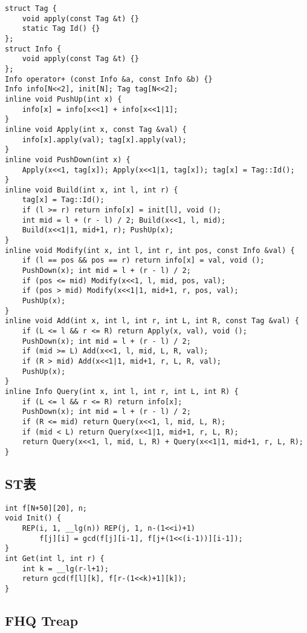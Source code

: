 \documentclass[a4paper,landscape,twocolumn]{ctexart}
\begin{document}
\begin{lstlisting}
struct Tag {
	void apply(const Tag &t) {}
	static Tag Id() {}
};
struct Info {
	void apply(const Tag &t) {}
};
Info operator+ (const Info &a, const Info &b) {}
Info info[N<<2], init[N]; Tag tag[N<<2];
inline void PushUp(int x) {
	info[x] = info[x<<1] + info[x<<1|1];
}
inline void Apply(int x, const Tag &val) {
	info[x].apply(val); tag[x].apply(val);
}
inline void PushDown(int x) {
	Apply(x<<1, tag[x]); Apply(x<<1|1, tag[x]); tag[x] = Tag::Id();
}
inline void Build(int x, int l, int r) {
	tag[x] = Tag::Id();
	if (l >= r) return info[x] = init[l], void ();
	int mid = l + (r - l) / 2; Build(x<<1, l, mid);
	Build(x<<1|1, mid+1, r); PushUp(x);
}
inline void Modify(int x, int l, int r, int pos, const Info &val) {
	if (l == pos && pos == r) return info[x] = val, void ();
	PushDown(x); int mid = l + (r - l) / 2;
	if (pos <= mid) Modify(x<<1, l, mid, pos, val);
	if (pos > mid) Modify(x<<1|1, mid+1, r, pos, val);
	PushUp(x);
}
inline void Add(int x, int l, int r, int L, int R, const Tag &val) {
	if (L <= l && r <= R) return Apply(x, val), void ();
	PushDown(x); int mid = l + (r - l) / 2;
	if (mid >= L) Add(x<<1, l, mid, L, R, val);
	if (R > mid) Add(x<<1|1, mid+1, r, L, R, val);
	PushUp(x);
}
inline Info Query(int x, int l, int r, int L, int R) {
	if (L <= l && r <= R) return info[x];
	PushDown(x); int mid = l + (r - l) / 2;
	if (R <= mid) return Query(x<<1, l, mid, L, R);
	if (mid < L) return Query(x<<1|1, mid+1, r, L, R);
	return Query(x<<1, l, mid, L, R) + Query(x<<1|1, mid+1, r, L, R);
}
\end{lstlisting}

\subsection{ST表}

\begin{lstlisting}
int f[N+50][20], n;
void Init() {
	REP(i, 1, __lg(n)) REP(j, 1, n-(1<<i)+1)
		f[j][i] = gcd(f[j][i-1], f[j+(1<<(i-1))][i-1]);
}
int Get(int l, int r) {
	int k = __lg(r-l+1);
	return gcd(f[l][k], f[r-(1<<k)+1][k]);
}
\end{lstlisting}

\subsection{FHQ \space Treap}
\end{document}
